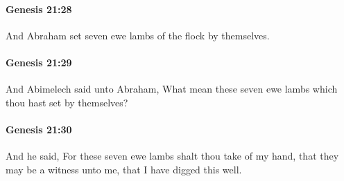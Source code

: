 		\paragraph{Genesis 21:28} %
			\label{GENESIS-21-28}

			And Abraham set seven ewe lambs of the flock by themselves.


		\paragraph{Genesis 21:29} %
			\label{GENESIS-21-29}

			And Abimelech said unto Abraham, What mean these seven ewe lambs which thou hast set by themselves?


		\paragraph{Genesis 21:30} %
			\label{GENESIS-21-30}

			And he said, For these seven ewe lambs shalt thou take of my hand, that they may be a witness unto me, that I have digged this well.



